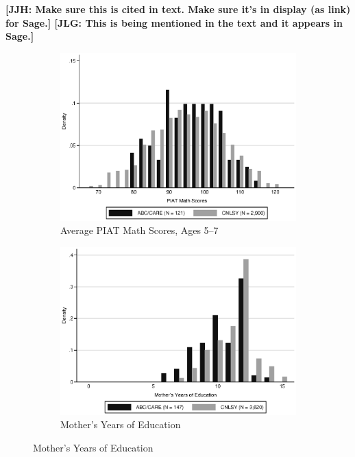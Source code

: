 \textbf{[JJH: Make sure this is cited in text. Make sure it's in display (as link) for Sage.]  [JLG: This is being mentioned in the text and it appears in Sage.]}

\begin{figure}[H]
		\caption{Support of ABC/CARE and Auxiliary Data} \label{fig:support}
	\begin{subfigure}[h]{0.8\textwidth}
	\centering
	\caption{Average PIAT Math Scores, Ages 5--7} \label{fig:support_math}
	\includegraphics[width=\textwidth]{AppOutput/Methodology/support_math.eps}
	\end{subfigure}
	
	\begin{subfigure}[h]{0.8\textwidth}
	\centering
	\caption{Mother's Years of Education} \label{fig:support_meduc}
	\includegraphics[width=\textwidth]{AppOutput/Methodology/support_momed.eps}
	\end{subfigure}
	
\end{figure}

